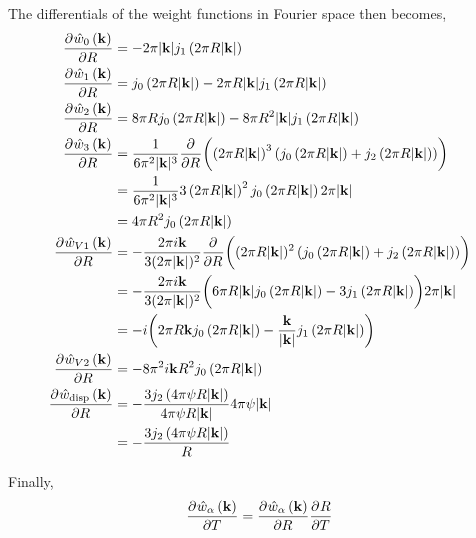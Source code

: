 \documentclass[12pt, letterpaper]{article}
\newcommand*{\pd}[3][]{\frac{\partial^{#1}#2}{\partial{#3}^{#1}}}%
\newcommand*{\lb}{\ensuremath{\left(}}
\newcommand*{\rb}{\ensuremath{\right)}}
\newcommand{\disp}{\ensuremath{\text{disp}}\xspace}
\begin{document}
The differentials of the weight functions in Fourier space then becomes,
\begin{align}
  \label{eq:weight_functions_fourier_diff}
  \pd{\hat{w}_0 \lb \mathbf{k}\rb}{R} &= - 2 \pi |\mathbf{k}| j_1\lb 2 \pi R |\mathbf{k}| \rb  \\
  \pd{\hat{w}_1 \lb \mathbf{k}\rb}{R} &= j_0\lb 2 \pi R |\mathbf{k}| \rb - 2 \pi R |\mathbf{k}| j_1\lb 2 \pi R |\mathbf{k}| \rb \\
  \pd{\hat{w}_2 \lb \mathbf{k}\rb}{R} &= 8 \pi R j_0\lb 2 \pi R |\mathbf{k}| \rb - 8 \pi R^2 |\mathbf{k}| j_1\lb 2 \pi R |\mathbf{k}| \rb  \\
  \pd{\hat{w}_3 \lb \mathbf{k}\rb}{R}  &=  \frac{1}{6 \pi^2 |\mathbf{k}|^3} \pd{}{R}\biggl( \lb 2 \pi R |\mathbf{k}|\rb ^3 \lb j_0\lb 2 \pi R |\mathbf{k}| \rb + j_2\lb 2 \pi R |\mathbf{k}| \rb \rb \biggr)  \nonumber \\
                                      &=  \frac{1}{6 \pi^2 |\mathbf{k}|^3} 3 \lb 2 \pi R |\mathbf{k}|\rb ^2  j_0\lb 2 \pi R |\mathbf{k}| \rb 2 \pi |\mathbf{k}| \nonumber  \\
                                      &=  4 \pi R^2 j_0\lb 2 \pi R |\mathbf{k}| \rb  \\
  \pd{\hat{w}_{V1} \lb \mathbf{k}\rb}{R} &= - \frac{2 \pi i \mathbf{k}}{3 (2 \pi |\mathbf{k}|)^2}  \pd{}{R}\biggl( (2 \pi R |\mathbf{k}|)^2 \lb j_0\lb 2 \pi R |\mathbf{k}| \rb + j_2\lb 2 \pi R |\mathbf{k}| \rb \rb \biggr) \nonumber \\
                                      &= - \frac{2 \pi i \mathbf{k}}{3 (2 \pi |\mathbf{k}|)^2} \biggl( 6 \pi R |\mathbf{k}| j_0\lb 2 \pi R |\mathbf{k}| \rb - 3 j_1\lb 2 \pi R |\mathbf{k}| \rb \biggr) 2 \pi |\mathbf{k}|  \nonumber \\
   &= - i \biggl( 2 \pi R \mathbf{k} j_0\lb 2 \pi R |\mathbf{k}| \rb - \frac{\mathbf{k}}{|\mathbf{k}|} j_1\lb 2 \pi R |\mathbf{k}| \rb \biggr)  \\
  \pd{\hat{w}_{V2} \lb \mathbf{k}\rb}{R} &= - 8 \pi^2 i \mathbf{k} R^2 j_0\lb 2 \pi R |\mathbf{k}| \rb  \\
  \pd{\hat{w}_{\disp} \lb \mathbf{k}\rb}{R} &= -\frac{3 j_2\lb 4 \pi \psi R |\mathbf{k}| \rb}{4 \pi \psi R |\mathbf{k}|} 4 \pi \psi |\mathbf{k}| \nonumber \\
                                      &= -\frac{3 j_2\lb 4 \pi \psi R |\mathbf{k}| \rb}{R}
\end{align}

Finally,
\begin{equation}
  \pd{\hat{w}_\alpha \lb \mathbf{k}\rb}{T} = \pd{\hat{w}_\alpha \lb \mathbf{k}\rb}{R} \pd{R}{T}
\end{equation}
\end{document}
